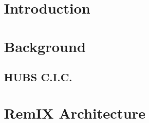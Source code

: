 \documentclass{sig-alternate-10pt}
\begin{document}
\begin{abstract}
\begin{comment}
Rural access networks are designed to bridge the `last-mile' broadband
gap in regions that are under-served by traditional broadband
providers. Their construction is bespoke, driven by their
beneficiaries, and determined by physical landscape, population
distribution, and monetary budget. Irrespective of their differences,
they are joined by one substantial challenge: connecting to the rest
of the Internet is prohibitively expensive. HUBS \textsc{c.i.c} was
created in Scotland to respond to this. It is a co-operative of access
network members that generates the economies of scale required to
afford backhaul and Internet transit. While intermediation at the IP
layer between the members and the Internet is required for reasons of
scale, it is neither necessary nor desirable amongst the member
networks themselves. In urban areas, networks could interconnect with
each other at an Internet Exchange Point (IXP). In Scotland where the
networks are scattered across 80,000km$^2$ of mountain, field, and sea
it is not so easy. We bridge this gap with a design for a distributed
Internet exchange for access networks in remote places. Doing so
allows for bilateral arrangements for mutual support and assistance
between these networks, and increases the resilience of access network
connectivity. We present the relevant components, and describe our
implementation, so that our efforts may be reproduced.
\end{comment} %
\end{abstract}


%
%

\section{Introduction} \label{sec:intro} 

\section{Background} \label{sec:context} 
\subsection{HUBS C.I.C.}

\section{RemIX Architecture} \label{sec:arch} 
\end{document}
